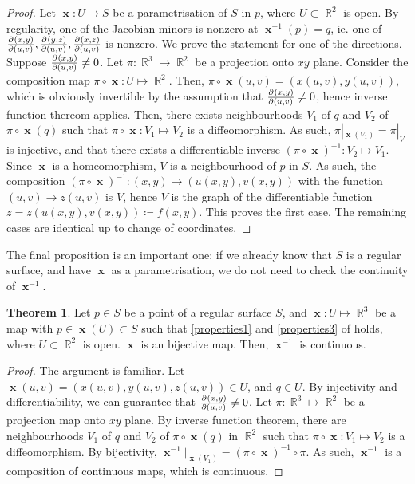 \documentclass{amsart} %
\theoremstyle{mytheoremstyle}
\theoremstyle{definition}
\newtheorem{theorem}[definition]{Theorem}
\numberwithin{equation}{section}
\DeclareMathOperator{\R}{\mathbb{R}}
\DeclareMathOperator{\1}{\mathbbm{1}}
\DeclareMathOperator{\x}{\mathbf{x}}
\begin{document}
\begin{proof}
	Let $\x: U \mapsto S$ be a parametrisation of $S$ in $p$, where $U \subset \R^2$ is open. By regularity, one of the Jacobian minors is nonzero at $\x^{-1} (p) = q$, ie. one of $\pd{(x,y)}{(u,v)},\pd{(y,z)}{(u,v)},\pd{(x,z)}{(u,v)}$ is nonzero. We prove the statement for one of the directions. Suppose $\pd{(x,y)}{(u,v)} \neq 0$. Let $\pi: \R^3 \to \R^2$ be a projection onto $xy$ plane. Consider the composition map $\pi \circ \x : U \mapsto \R^2$. Then, $\pi \circ \x(u,v) = (x(u,v), y(u,v))$, which is obviously invertible by the assumption that $\pd{(x,y)}{(u,v)} \neq 0$, hence inverse function thereom applies. Then, there exists neighbourhoods $V_1$ of $q$ and $V_2 $ of $\pi \circ \x (q)$ such that $\pi \circ \x: V_1 \mapsto V_2 $ is a diffeomorphism. As such, $\pi|_{\x(V_1)}  = \pi|_{V}$ is injective, and that there exists a differentiable inverse $(\pi \circ \x)^{-1} : V_2 \mapsto V_1$. Since $\x$ is a homeomorphism, $V$ is a neighbourhood of $p$ in $S$. As such, the composition $(\pi \circ \x)^{-1} : (x,y) \to (u(x,y),v(x,y))$ with the function $(u,v) \to z(u,v)$ is $V$, hence $V$ is the graph of the differentiable function $z = z(u(x,y),v(x,y)) \coloneqq f(x,y)$. This proves the first case. The remaining cases are identical up to change of coordinates.
\end{proof}


The final proposition is an important one: if we already know that $S$ is a regular surface, and have $\x$ as a parametrisation, we do not need to check the continuity of $\x^{-1}$. 

\begin{theorem}
	\label{thmregularsurfaceparametrisationx-1iscontinuous}
	Let $p \in S$ be a point of a regular surface $S$, and $\x: U \mapsto \R^3$ be a map with $p \in \x(U) \subset S$ such that \eqref{properties1} and \eqref{properties3} of  holds, where $U \subset \R^2$ is open. $\x$ is an bijective map. Then, $\x^{-1}$ is continuous.
\end{theorem}

\begin{proof}
	The argument is familiar. Let $\x(u,v) = (x(u,v), y(u,v), z(u,v) ) \in U$, and $q \in U$. By injectivity and differentiability, we can guarantee that $\pd{(x,y)}{(u,v)} \neq 0$. Let $\pi: \R^3 \mapsto \R^2$ be a projection map onto $xy$ plane. By inverse function theorem, there are neighbourhoods $V_1$ of $q$ and $V_2$ of $\pi \circ \x (q)$ in $\R^2$ such that $\pi \circ \x: V_1 \mapsto V_2$ is a diffeomorphism. By bijectivity, $\x^{-1}|_{\x(V_1)} = (\pi \circ \x)^{-1} \circ \pi$. As such, $\x^{-1}$ is a composition of continuous maps, which is continuous. 
\end{proof}
\end{document}
